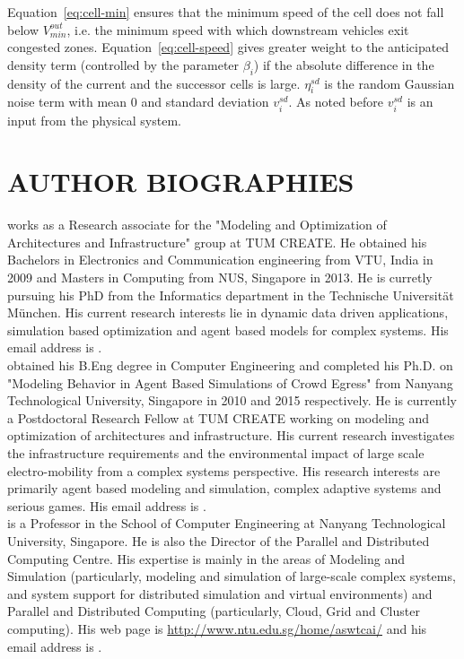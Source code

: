 \documentclass{wscpaperproc}
\theoremstyle{wsc}
\begin{document}
 
Equation~\ref{eq:cell-min} ensures that the minimum speed of the cell does not fall below $V^{out}_{min}$, i.e. the minimum speed with which downstream vehicles exit congested zones. Equation~\ref{eq:cell-speed} gives greater weight to the anticipated density term (controlled by the parameter $\beta_i$) if the absolute difference in the density of the current and the successor cells is large. $\eta_i^{sd}$ is the random Gaussian noise term with mean $0$ and standard deviation $v_i^{sd}$. As noted before $v_i^{sd}$ is an input from the physical system.





\section*{AUTHOR BIOGRAPHIES}

 works as a Research associate for the "Modeling and Optimization of Architectures and Infrastructure" group at TUM CREATE. He obtained his Bachelors in Electronics and Communication engineering from VTU, India in 2009 and Masters in Computing from NUS, Singapore in 2013. He is curretly pursuing his PhD from the Informatics department in the Technische Universit\"at M\"unchen. His current research interests lie in dynamic data driven applications, simulation based optimization and agent based models for complex systems. His email address is .\\

 obtained his B.Eng degree in Computer Engineering and completed his Ph.D. on "Modeling Behavior in Agent Based Simulations of Crowd Egress" from Nanyang Technological University, Singapore in 2010 and 2015 respectively. He is currently a Postdoctoral Research Fellow at TUM CREATE working on modeling and optimization of architectures and infrastructure. His current research investigates the infrastructure requirements and the environmental impact of large scale electro-mobility from a complex systems perspective. His research interests are primarily agent based modeling and simulation, complex adaptive systems and serious games. His email address is .\\

 is a Professor in the School of Computer Engineering at Nanyang Technological University, Singapore. He is also the Director of the Parallel and Distributed Computing Centre. His expertise is mainly in the areas of Modeling and Simulation (particularly, modeling and simulation of large-scale complex systems, and system support for distributed simulation and virtual environments) and Parallel and Distributed Computing (particularly, Cloud, Grid and Cluster computing). His web page is \hyperref{http://www.ntu.edu.sg/home/aswtcai/}{}{}{http://www.ntu.edu.sg/home/aswtcai/} and his email address is .\\
\end{document}
